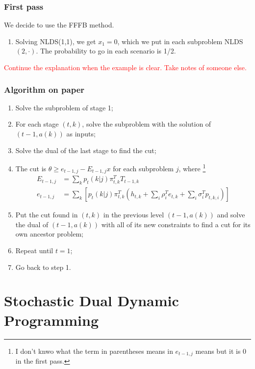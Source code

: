 \documentclass[12pt, openany]{report}
\theoremstyle{definition}
\begin{document}
\subsection{First pass}
We decide to use the FFFB method. 
\begin{enumerate}
	\item Solving NLDS(1,1), we get $x_1=0$, which we put in each subproblem NLDS$(2,\cdot)$. The probability to go in each scenario is 1/2. 
\end{enumerate}
\textcolor{red}{Continue the explanation when the example is clear. Take notes of someone else.}
\subsection{Algorithm on paper}
\begin{enumerate}
	\item Solve the subproblem of stage 1;
	\item For each stage $(t,k)$, solve the subproblem with the solution of $(t-1, a(k))$ as inputs;
	\item Solve the dual of the last stage to find the cut;
	\item The cut is $\theta \ge e_{t-1,j}-E_{t-1,j}x$ for each subproblem $j$, where \footnote{I don't knwo what the term in parentheses means in $e_{t-1,j}$ means but it is 0 in the first pass.}
	\begin{equation}
		\begin{aligned}
			E_{t-1,j} &= \sum_k p_t(k|j)\pi_{t,k}^T T_{t-1,k}\\
			e_{t-1,j} &= \sum_k \left[p_t(k|j)\pi_{t,k}^T \left(h_{t,k}+\sum_i \rho_i^T e_{t,k} + \sum_i \sigma_i^T p_{t,k,i}\right)\right]
		\end{aligned}
	\end{equation}
	\item Put the cut found in $(t,k)$ in the previous level $(t-1,a(k))$ and solve the dual of $(t-1,a(k))$ with all of its new constraints to find a cut for its own ancestor problem;
	\item Repeat until $t=1$;
	\item Go back to step 1.
\end{enumerate}
\chapter{Stochastic Dual Dynamic Programming}
\end{document}
